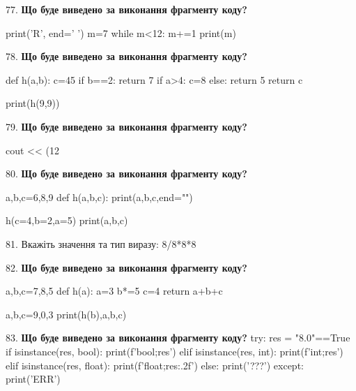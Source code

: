 \documentclass[11pt]{article}
\begin{document}
77. \textbf{Що буде виведено за виконання фрагменту коду?}

print('R', end=' ')
m=7
while m<12:
    m+=1
print(m)

\par\vspace{5mm}

78. \textbf{Що буде виведено за виконання фрагменту коду?}

def h(a,b):
    c=45
    if b==2:
        return 7
    if a>4:
         c=8
    else: 
        return 5
    return c

print(h(9,9))
\par\vspace{5mm}

79. \textbf{Що буде виведено за виконання фрагменту коду?}

cout << (12 %
\par\vspace{5mm}

80. \textbf{Що буде виведено за виконання фрагменту коду?}

a,b,c=6,8,9
def h(a,b,c):
    print(a,b,c,end="")

h(c=4,b=2,a=5)
print(a,b,c)

\par\vspace{5mm}

81. 
Вкажіть значення та тип виразу:
8/8*8*8
\par\vspace{5mm}

82. \textbf{Що буде виведено за виконання фрагменту коду?}

a,b,c=7,8,5
def h(a):
    a=3
    b*=5
    c=4
    return a+b+c

a,b,c=9,0,3
print(h(b),a,b,c)
\par\vspace{5mm}

83. \textbf{Що буде виведено за виконання фрагменту коду?}
try:
    res = "8.0"==True
    if isinstance(res, bool):
        print(f'bool;{res}')
    elif isinstance(res, int):
        print(f'int;{res}')
    elif isinstance(res, float):
        print(f'float;{res:.2f}')
    else:
        print('???')
except:
    print('ERR')
\par\vspace{5mm}
\end{document}
